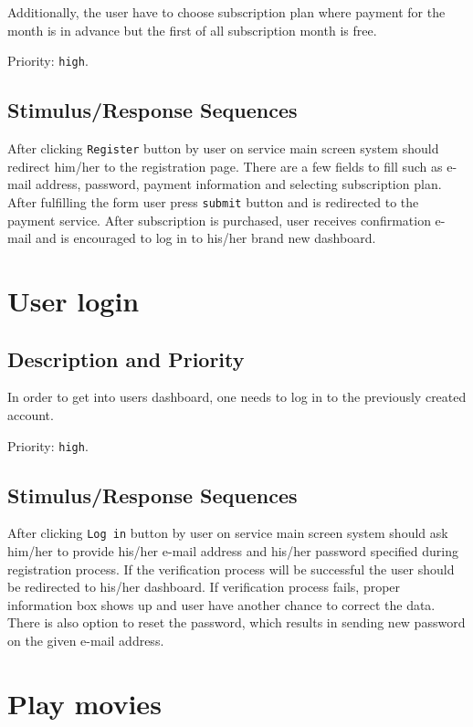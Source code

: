\documentclass{scrreprt}
\begin{document}
Additionally, the user have to choose subscription plan where payment for the month is in advance but the first of all subscription month is free.

Priority: \verb|high|.

\subsection{Stimulus/Response Sequences}

After clicking \verb|Register| button by user on service main screen system should redirect him/her to the registration page. There are a few fields to fill such as e-mail address, password,  payment information and selecting subscription plan. After fulfilling the form user press \verb|submit| button and is redirected to the payment service. After subscription is purchased, user receives confirmation e-mail and is encouraged to log in to his/her brand new dashboard.

\section{User login}

\subsection{Description and Priority}

In order to get into users dashboard, one needs to log in to the previously created account.

Priority: \verb|high|.

\subsection{Stimulus/Response Sequences}

After clicking \verb|Log in| button by user on service main screen system should ask him/her to provide his/her e-mail address and his/her password specified during registration process. If the verification process will be successful the user should be redirected to his/her dashboard. If verification process fails, proper information box shows up and user have another chance to correct the data. There is also option to reset the password, which results in sending new password on the given e-mail address.

\section{Play movies}
\end{document}
